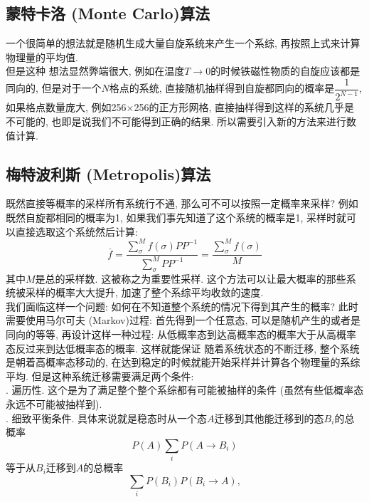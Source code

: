 \documentclass[UTF8]{ctexart}
\begin{document}
        \subsection{蒙特卡洛 (Monte Carlo)算法}
            \indent 一个很简单的想法就是随机生成大量自旋系统来产生一个系综, 再按照上式来计算物理量的平均值.\\
            \indent 但是这种    想法显然弊端很大, 例如在温度$T\rightarrow 0$的时候铁磁性物质的自旋应该都是同向的, 但是对于一个$N$格点的系统,
            直接随机抽样得到自旋都同向的概率是$\dfrac{1}{2^{N-1}}$, 如果格点数量庞大, 例如256$\times$256的正方形网格, 直接抽样得到这样的系统几乎是不可能的,
            也即是说我们不可能得到正确的结果. 所以需要引入新的方法来进行数值计算.
        \subsection{梅特波利斯 (Metropolis)算法}
            \indent 既然直接等概率的采样所有系统行不通, 那么可不可以按照一定概率来采样? 例如既然自旋都相同的概率为1, 如果我们事先知道了这个系统的概率是1,
            采样时就可以直接选取这个系统然后计算:
            \begin{equation}
                \overline{f}=\dfrac{\sum\limits_\sigma^M f(\sigma)PP^{-1}}{\sum\limits_\sigma^M PP^{-1}}=\dfrac{\sum\limits_\sigma^M f(\sigma)}{M}
            \end{equation}
            其中$M$是总的采样数. 这被称之为重要性采样. 这个方法可以让最大概率的那些系统被采样的概率大大提升, 加速了整个系综平均收敛的速度.\\
            \indent 我们面临这样一个问题: 如何在不知道整个系统的情况下得到其产生的概率? 此时需要使用马尔可夫 (Markov)过程: 首先得到一个任意态,
            可以是随机产生的或者是同向的等等, 再设计这样一种过程: 从低概率态到达高概率态的概率大于从高概率态反过来到达低概率态的概率. 这样就能保证
            随着系统状态的不断迁移, 整个系统是朝着高概率态移动的, 在达到稳定的时候就能开始采样并计算各个物理量的系综平均. 但是这种系统迁移需要满足两个条件:\\
            . 遍历性. 这个是为了满足整个整个系综都有可能被抽样的条件 (虽然有些低概率态永远不可能被抽样到).\\
            . 细致平衡条件. 具体来说就是稳态时从一个态$A$迁移到其他能迁移到的态$B_i$的总概率
            \begin{equation}
                P(A)\sum\limits_iP(A\rightarrow B_i)
            \end{equation}
            等于从$B_i$迁移到$A$的总概率
            \begin{equation}
                \sum\limits_iP(B_i)P(B_i\rightarrow A),
            \end{equation}
\end{document}
